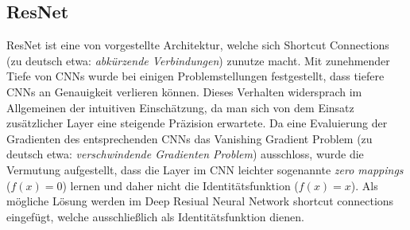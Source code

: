 \subsection{ResNet}
\label{sek:resnet}
ResNet ist eine von \textcite{He_2016} vorgestellte Architektur, welche sich Shortcut Connections (zu deutsch etwa: \textit{abkürzende Verbindungen}) zunutze macht. Mit zunehmender Tiefe von CNNs wurde bei einigen Problemstellungen festgestellt, dass tiefere CNNs an Genauigkeit verlieren können. Dieses Verhalten widersprach im Allgemeinen der intuitiven Einschätzung, da man sich von dem Einsatz zusätzlicher Layer eine steigende Präzision erwartete. Da eine Evaluierung der Gradienten des entsprechenden CNNs das Vanishing Gradient Problem (zu deutsch etwa: \textit{verschwindende Gradienten Problem}) ausschloss, wurde die Vermutung aufgestellt, dass die Layer im CNN leichter sogenannte \textit{zero mappings} ($f(x) = 0$) lernen und daher nicht die Identitätsfunktion ($f(x) = x$). Als mögliche Lösung werden im Deep Resiual Neural Network shortcut connections eingefügt, welche ausschließlich als Identitätsfunktion dienen. 

